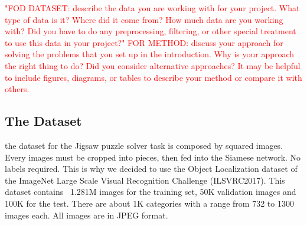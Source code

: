 
\textcolor{red}{"FOD DATASET: describe the data you are working with for your project. What type of data is it? Where did it come from? How much data are you working with? Did you have to do any preprocessing, filtering, or other special treatment to use this data in your project?"\newline
FOR METHOD: discuss your approach for solving the problems that you set up in the introduction. Why is your approach the right thing to do? Did you consider alternative approaches? It may be helpful to include figures, diagrams, or tables to describe your method or compare it with others.}

\subsection{The Dataset}
the dataset for the Jigsaw puzzle solver task is composed by squared images. Every images must be cropped into pieces, then fed into the Siamese network. No labels required. This is why we decided to use the Object Localization dataset \cite{ILSVRC15} of the ImageNet Large Scale Visual Recognition Challenge (ILSVRC2017). This dataset contains ~1.281M images for the training set, 50K validation images and 100K for the test. There are about 1K categories with a range from 732 to 1300 images each. All images are in JPEG format.

